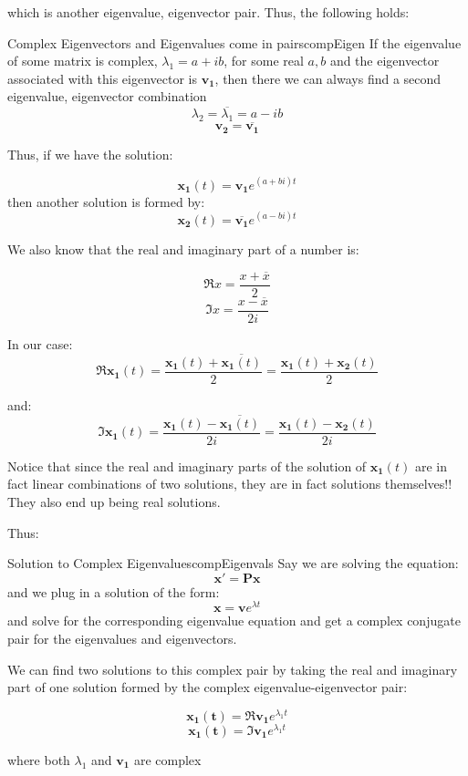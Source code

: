 \documentclass{report}
\begin{document}
which is another eigenvalue, eigenvector pair. Thus, the following holds:

\begin{mytheo}{Complex Eigenvectors and Eigenvalues come in pairs}{compEigen}
    If the eigenvalue of some matrix is complex, $\lambda_1 = a + ib$, for some real $a,b$ and the eigenvector associated with this eigenvector is $\mathbf{v_1}$, then there we can always find a second eigenvalue, eigenvector combination 
    $$\lambda_2 = \overline{\lambda_1} = a - ib$$
    $$\mathbf{v_2} = \overline{\mathbf{v_1}}$$
\end{mytheo}


Thus, if we have the solution:

$$\mathbf{x_1}(t)=\mathbf{v_1}e^{(a+bi) t}$$
then another solution is formed by:
$$\mathbf{x_2}(t)=\overline{\mathbf{v_1}}e^{(a-bi) t}$$

We also know that the real and imaginary part of a number is:

$$\Re{x} = \frac{x+\overline{x}}{2}$$
$$\Im{x} = \frac{x-\overline{x}}{2i}$$

In our case:
$$\Re{\mathbf{x_1}(t)} = \frac{\mathbf{x_1}(t)+\overline{\mathbf{x_1}(t)}}{2}=\frac{\mathbf{x_1}(t)+\mathbf{x_2}(t)}{2}$$

and:
$$\Im{\mathbf{x_1}(t)} = \frac{\mathbf{x_1}(t)-\overline{\mathbf{x_1}(t)}}{2i}=\frac{\mathbf{x_1}(t)-\mathbf{x_2}(t)}{2i}$$

Notice that since the real and imaginary parts of the solution of $\mathbf{x_1}(t)$ are in fact linear combinations of two solutions, they are in fact solutions themselves!! They also end up being real solutions.

Thus:
\begin{mytheo}{Solution to Complex Eigenvalues}{compEigenvals}
    Say we are solving the equation:
    $$\mathbf{x'} = \mathbf{Px}$$
    and we plug in a solution of the form:
    $$\mathbf{x} = \mathbf{v}e^{\lambda t}$$
    and solve for the corresponding eigenvalue equation and get a complex conjugate pair for the eigenvalues and eigenvectors.
    
    We can find two solutions to this complex pair by taking the real and imaginary part of one solution formed by the complex eigenvalue-eigenvector pair:
    
    $$\mathbf{x_1(t)} = \Re{\mathbf{v_1}e^{\lambda_1 t}}$$
    $$\mathbf{x_1(t)} = \Im{\mathbf{v_1}e^{\lambda_1 t}}$$
    
    where both $\lambda_1$ and $\mathbf{v_1}$ are complex
\end{mytheo}
\end{document}
